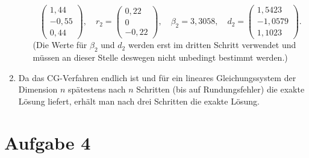 \documentclass{exercise}
\begin{document}
\begin{enumerate}
\begin{enumerate}
\[\begin{pmatrix}
                    1,44\\
                    -0,55\\
                    0,44
                \end{pmatrix}, \quad r_2 = \begin{pmatrix}
                    0,22\\
                    0\\
                    -0,22
                \end{pmatrix}, \quad \beta_2 = 3,3058, \quad d_2 = \begin{pmatrix}
                    1,5423\\
                    -1,0579\\
                    1,1023
                \end{pmatrix}.
            \]
            (Die Werte für \(\beta_2\) und \(d_2\) werden erst im dritten Schritt verwendet und müssen an dieser Stelle deswegen nicht unbedingt bestimmt werden.)
        \end{enumerate}
        \item Da das CG-Verfahren endlich ist und für ein lineares Gleichungssystem der Dimension \(n\) spätestens nach \(n\) Schritten (bis auf Rundungsfehler) die exakte Lösung liefert, erhält man nach drei Schritten die exakte Lösung.
    \end{enumerate}


    \section*{Aufgabe 4}
    
\end{document}
